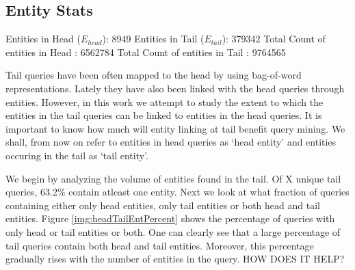 \subsection{Entity Stats}









Entities in Head ($E_{head}$): 8949
Entities in Tail ($E_{tail}$): 379342
Total Count of entities in Head : 6562784
Total Count of entities in Tail : 9764565





Tail queries have been often mapped to the head \cite{} by using bag-of-word representations.
Lately they have also been linked with the head queries through entities. However, in this work
we attempt to study the extent to which the entities in the tail queries can be linked to entities 
in the head queries. It is important to know how much will entity linking at tail benefit query mining. 
We shall, from now on refer to entities in head queries as `head entity' 
and entities occuring in the tail as `tail entity'. 


We begin by analyzing the volume of entities found in the tail. Of X unique tail queries,
63.2\% contain atleast one entity. 
Next we look at what fraction of queries containing either only head entities, only tail entities 
or both head and tail entities. Figure \ref{img:headTailEntPercent} shows the percentage of 
queries with only head or tail entities or both. One can clearly see that a large percentage of tail 
queries contain both head and tail entities. Moreover, this percentage gradually rises with the 
number of entities in the query. HOW DOES IT HELP?

